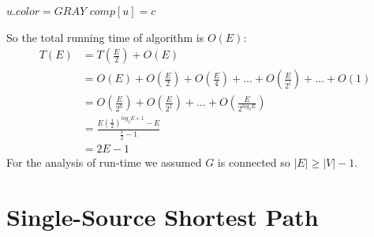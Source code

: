 \documentclass{book}
\begin{document}
	\begin{algorithm*}[h!]
		\begin{algorithmic}[1]
				\State $u.color = GRAY$
				\State $comp[u] = c$
						\State {}
					\EndIf
				\EndFor
			\EndFunction
		\end{algorithmic}
	\end{algorithm*}
	So the total running time of algorithm is $O(E)$:
	\begin{equation*}
		\begin{split}
		T(E) &= T(\frac{E}{2}) + O(E) \\
		&= O(E) + O(\frac{E}{2}) + O(\frac{E}{4}) + \dots + O(\frac{E}{2^i}) + \dots + O(1) \\
		&= O(\frac{E}{2^0}) + O(\frac{E}{2^1}) + \dots + O(\frac{E}{2^{log_2{E}}}) \\
		&= \frac{E(\frac{1}{2})^{log_2{E} + 1} - E}{\frac{1}{2} - 1} \\
		&= 2E - 1
		\end{split}
	\end{equation*}
	For the analysis of run-time we assumed $G$ is connected so $|E| \ge |V| - 1$.
	\chapter{Single-Source Shortest Path}
	\label{psec:ShortestPathClassification}	
\end{document}
